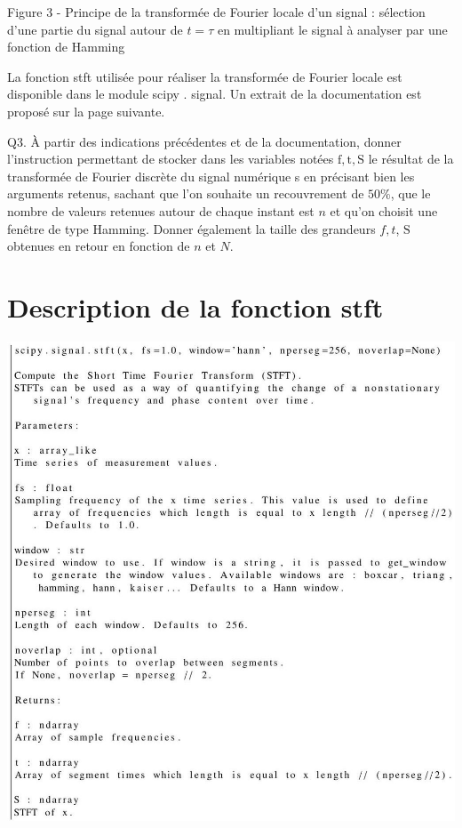 \documentclass[10pt]{article}
\begin{document}
Figure 3 - Principe de la transformée de Fourier locale d'un signal : sélection d'une partie du signal autour de $t=\tau$ en multipliant le signal à analyser par une fonction de Hamming

La fonction stft utilisée pour réaliser la transformée de Fourier locale est disponible dans le module scipy . signal. Un extrait de la documentation est proposé sur la page suivante.

Q3. À partir des indications précédentes et de la documentation, donner l'instruction permettant de stocker dans les variables notées $\mathrm{f}, \mathrm{t}, \mathrm{S}$ le résultat de la transformée de Fourier discrète du signal numérique s en précisant bien les arguments retenus, sachant que l'on souhaite un recouvrement de $50 \%$, que le nombre de valeurs retenues autour de chaque instant est $n$ et qu'on choisit une fenêtre de type Hamming. Donner également la taille des grandeurs $f, t$, $\mathrm{S}$ obtenues en retour en fonction de $n$ et $N$.

\section{Description de la fonction stft}
\includegraphics[max width=\textwidth]{2022_02_02_1af495ea60fb42b668bfg-05}
\end{document}
